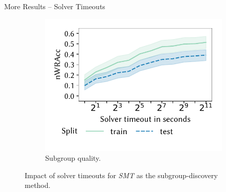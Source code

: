\documentclass[en, navbaroff, handout]{sdqbeamer}
\begin{document}
\begin{frame}[t]{More Results -- Solver Timeouts}
\begin{figure}
\begin{subfigure}[t]{0.4\textwidth}
			\includegraphics[width=\textwidth, trim=10 25 10 10, clip]{plots/csd-timeouts-nwracc.pdf}
			\caption{
				Subgroup quality.
			}
			\label{fig:csd:timeouts-nwracc}
		\end{subfigure}
		\caption*{
			Impact of solver timeouts for \emph{SMT} as the subgroup-discovery method.
		}
		\label{fig:csd:timeouts}
	\end{figure}
\end{frame}
\end{document}
